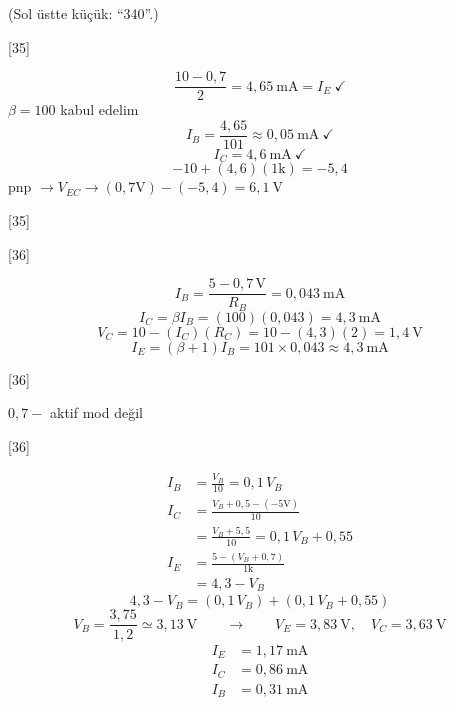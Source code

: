 \documentclass[11pt,a4paper]{article}
\begin{document}
{\small\color{kursunkalem}(Sol üstte küçük: ``340''.)}
\begin{ornek}[6.7]
[35]
\end{ornek}

\begin{cozum}
\[ \frac{10-0{,}7}{2} = 4{,}65\ \mathrm{mA} = I_E \ \checkmark \]
$\beta = 100$ kabul edelim
\[ I_B = \frac{4{,}65}{101} \approx 0{,}05\ \mathrm{mA}\ \checkmark \]
\[ I_C = 4{,}6\ \mathrm{mA}\ \checkmark \]
\[ -10+(4{,}6)(1\mathrm{k}) = -5{,}4 \]
pnp $\rightarrow V_{EC} \rightarrow (0{,}7\mathrm{V})-(-5{,}4) = 6{,}1\ \mathrm{V}$
\end{cozum}

[35]

\begin{ornek}[6.8]
[36]
\end{ornek}

\begin{cozum}
\[ I_B = \frac{5-0{,}7\,\mathrm{V}}{R_B} = 0{,}043\ \mathrm{mA} \]
\[ I_C = \beta I_B = (100)(0{,}043) = 4{,}3\ \mathrm{mA} \]
\[ V_C = 10-(I_C)(R_C) = 10-(4{,}3)(2) = 1{,}4\ \mathrm{V} \]
\[ I_E = (\beta+1)I_B = 101\times 0{,}043 \approx 4{,}3\ \mathrm{mA} \]
\end{cozum}

\begin{ornek}[6.9]
[36]

$0{,}7-$ \qquad aktif mod değil
\end{ornek}

\begin{cozum}
[36]

\begin{align*}
I_B &= \frac{V_B}{10} = 0{,}1\,V_B \\
I_C &= \frac{V_B+0{,}5-(-5\mathrm{V})}{10} \\
 &= \frac{V_B+5{,}5}{10} = 0{,}1\,V_B+0{,}55 \\
I_E &= \frac{5-(V_B+0{,}7)}{1\mathrm{k}} \\
 &= 4{,}3-V_B
\end{align*}
\[ 4{,}3-V_B = (0{,}1\,V_B)+(0{,}1\,V_B+0{,}55) \]
\[ V_B = \frac{3{,}75}{1{,}2} \simeq 3{,}13\ \mathrm{V} \qquad\rightarrow\qquad V_E = 3{,}83\ \mathrm{V}, \quad V_C = 3{,}63\ \mathrm{V} \]
\begin{align*}
I_E &= 1{,}17\ \mathrm{mA} \\
I_C &= 0{,}86\ \mathrm{mA} \\
I_B &= 0{,}31\ \mathrm{mA}
\end{align*}
\end{cozum}
\end{document}
